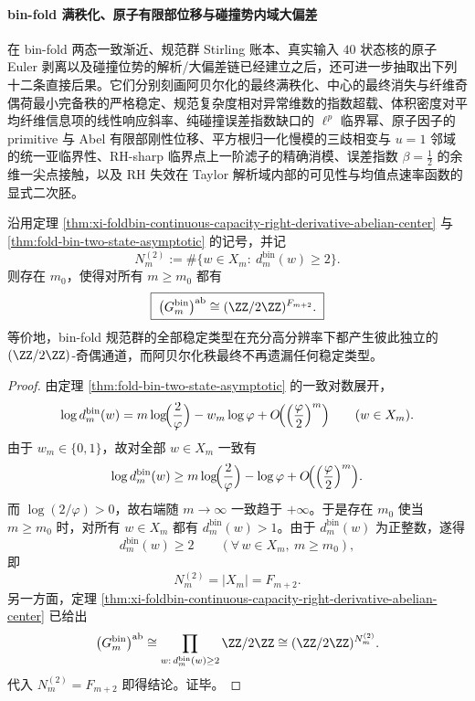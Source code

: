 \paragraph{bin-fold 满秩化、原子有限部位移与碰撞势内域大偏差}
在 bin-fold 两态一致渐近、规范群 Stirling 账本、真实输入 \(40\) 状态核的原子 Euler 剥离以及碰撞位势的解析/大偏差链已经建立之后，还可进一步抽取出下列十二条直接后果。它们分别刻画阿贝尔化的最终满秩化、中心的最终消失与纤维奇偶荷最小完备秩的严格稳定、规范复杂度相对异常维数的指数超载、体积密度对平均纤维信息项的线性响应斜率、纯碰撞误差指数缺口的 \(\ell^p\) 临界幂、原子因子的 primitive 与 Abel 有限部刚性位移、平方根归一化慢模的三歧相变与 \(u=1\) 邻域的统一亚临界性、RH-sharp 临界点上一阶滤子的精确消模、误差指数 \(\beta=\tfrac12\) 的余维一尖点接触，以及 RH 失效在 Taylor 解析域内部的可见性与均值点速率函数的显式二次胚。

\begin{theorem}\label{thm:xi-time-part65-binfold-abel-eventual-full-rank}
沿用定理 \ref{thm:xi-foldbin-continuous-capacity-right-derivative-abelian-center} 与
\ref{thm:fold-bin-two-state-asymptotic} 的记号，并记
\[
N_m^{(2)}:=\#\{w\in X_m:\ d_m^{\mathrm{bin}}(w)\ge 2\}.
\]
则存在 \(m_0\)，使得对所有 \(m\ge m_0\) 都有
\[
\boxed{\;
\bigl(G_m^{\mathrm{bin}}\bigr)^{\mathrm{ab}}
\cong
(\ZZ/2\ZZ)^{F_{m+2}}.\;}
\]
等价地，bin-fold 规范群的全部稳定类型在充分高分辨率下都产生彼此独立的 \((\ZZ/2\ZZ)\)-奇偶通道，而阿贝尔化秩最终不再遗漏任何稳定类型。
\end{theorem}
\begin{proof}
由定理 \ref{thm:fold-bin-two-state-asymptotic} 的一致对数展开，
\[
\log d_m^{\mathrm{bin}}(w)
=
m\log\!\Bigl(\frac{2}{\varphi}\Bigr)-w_m\log\varphi
+O\!\Bigl(\Bigl(\frac{\varphi}{2}\Bigr)^m\Bigr)
\qquad (w\in X_m).
\]
由于 \(w_m\in\{0,1\}\)，故对全部 \(w\in X_m\) 一致有
\[
\log d_m^{\mathrm{bin}}(w)
\ge
m\log\!\Bigl(\frac{2}{\varphi}\Bigr)-\log\varphi
+O\!\Bigl(\Bigl(\frac{\varphi}{2}\Bigr)^m\Bigr).
\]
而 \(\log(2/\varphi)>0\)，故右端随 \(m\to\infty\) 一致趋于 \(+\infty\)。于是存在 \(m_0\) 使当 \(m\ge m_0\) 时，对所有 \(w\in X_m\) 都有 \(d_m^{\mathrm{bin}}(w)>1\)。由于 \(d_m^{\mathrm{bin}}(w)\) 为正整数，遂得
\[
d_m^{\mathrm{bin}}(w)\ge 2
\qquad(\forall\,w\in X_m,\ m\ge m_0),
\]
即
\[
N_m^{(2)}=|X_m|=F_{m+2}.
\]
另一方面，定理 \ref{thm:xi-foldbin-continuous-capacity-right-derivative-abelian-center} 已给出
\[
\bigl(G_m^{\mathrm{bin}}\bigr)^{\mathrm{ab}}
\cong
\prod_{w:\,d_m^{\mathrm{bin}}(w)\ge 2}\ZZ/2\ZZ
\cong
(\ZZ/2\ZZ)^{N_m^{(2)}}.
\]
代入 \(N_m^{(2)}=F_{m+2}\) 即得结论。证毕。
\end{proof}

